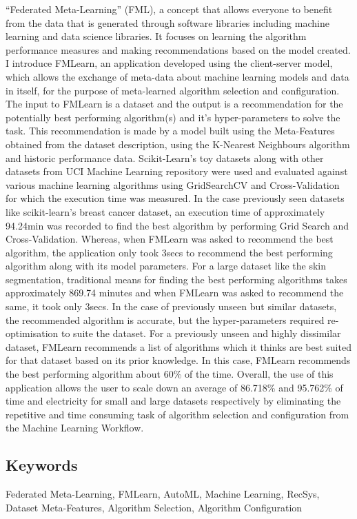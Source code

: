 \quad\quad “Federated Meta-Learning” (FML), a concept that allows everyone to benefit from the data that is generated through software libraries including machine learning and data science libraries. It focuses on learning the algorithm performance measures and making recommendations based on the model created. I introduce FMLearn, an application developed using the client-server model, which allows the exchange of meta-data about machine learning models and data in itself, for the purpose of meta-learned algorithm selection and configuration. 
The input to FMLearn is a dataset and the output is a recommendation for the potentially best performing algorithm(s) and it’s hyper-parameters to solve the task. This recommendation is made by a model built using the Meta-Features obtained from the dataset description, using the K-Nearest Neighbours algorithm and historic performance data.
Scikit-Learn’s toy datasets along with other datasets from UCI Machine Learning repository were used and evaluated against various machine learning algorithms using GridSearchCV and Cross-Validation for which the execution time was measured.
In the case previously seen datasets like scikit-learn’s breast cancer dataset, an execution time of approximately 94.24min was recorded to find the best algorithm by performing Grid Search and Cross-Validation. Whereas, when FMLearn was asked to recommend the best algorithm, the application only took 3secs to recommend the best performing algorithm along with its model parameters.
For a large dataset like the skin segmentation, traditional means for finding the best performing algorithms takes approximately 869.74 minutes and when FMLearn was asked to recommend the same, it took only 3secs.
In the case of previously unseen but similar datasets, the recommended algorithm is accurate, but the hyper-parameters required re-optimisation to suite the dataset. For a previously unseen and highly dissimilar dataset, FMLearn recommends a list of algorithms which it thinks are best suited for that dataset based on its prior knowledge. In this case, FMLearn recommends the best performing algorithm about 60\% of the time.
Overall, the use of this application allows the user to scale down an average of 86.718\% and 95.762\% of time and electricity for small and large datasets respectively by eliminating the repetitive and time consuming task of algorithm selection and configuration from the Machine Learning Workflow. 

\subsection*{Keywords}
{Federated Meta-Learning, FMLearn, AutoML, Machine Learning, RecSys, Dataset Meta-Features, Algorithm Selection, Algorithm Configuration}
